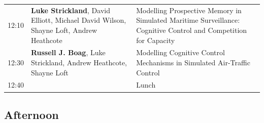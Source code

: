 \documentclass[]{article}
\begin{document}
\begin{longtable}[]{@{}lll@{}}
\begin{minipage}[t]{0.03\columnwidth}\raggedright\strut
12:10\strut
\end{minipage} & \begin{minipage}[t]{0.38\columnwidth}\raggedright\strut
\textbf{Luke Strickland}, David Elliott, Michael David Wilson, Shayne
Loft, Andrew Heathcote\strut
\end{minipage} & \begin{minipage}[t]{0.51\columnwidth}\raggedright\strut
Modelling Prospective Memory in Simulated Maritime Surveillance:
Cognitive Control and Competition for Capacity\strut
\end{minipage}\tabularnewline
\begin{minipage}[t]{0.03\columnwidth}\raggedright\strut
12:30\strut
\end{minipage} & \begin{minipage}[t]{0.38\columnwidth}\raggedright\strut
\textbf{Russell J. Boag}, Luke Strickland, Andrew Heathcote, Shayne
Loft\strut
\end{minipage} & \begin{minipage}[t]{0.51\columnwidth}\raggedright\strut
Modelling Cognitive Control Mechanisms in Simulated Air-Traffic
Control\strut
\end{minipage}\tabularnewline
\begin{minipage}[t]{0.03\columnwidth}\raggedright\strut
12:40\strut
\end{minipage} & \begin{minipage}[t]{0.38\columnwidth}\raggedright\strut
\strut
\end{minipage} & \begin{minipage}[t]{0.51\columnwidth}\raggedright\strut
Lunch\strut
\end{minipage}\tabularnewline
\bottomrule
\end{longtable}

\subsection{Afternoon}\label{afternoon}
\end{document}
